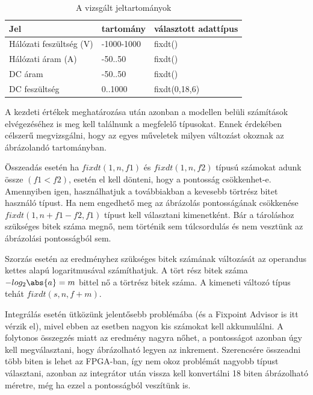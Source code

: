 \begin{table}[]
\centering
\begin{tabular}{|l|l|l|}
\hline
Jel  					&		 tartomány              & választott adattípus \\ \hline
Hálózati feszültség (V) & -1000-1000          	 		& fixdt()\\ \hline
Hálózati áram (A) 		& -50..50						& fixdt()\\ \hline
DC áram 				& -50..50        	   	   		& fixdt() \\ \hline
DC feszültség  			& 0..1000     			 		& fixdt(0,18,6)    \\ \hline
\end{tabular}
\caption{A vizsgált jeltartományok}
\label{tab:values}
\end{table} 


A kezdeti értékek meghatározása után azonban a modellen belüli számítások elvégezéséhez is meg kell találnunk a megfelelő típusokat. Ennek érdekében célszerű megvizsgálni, hogy az egyes műveletek milyen változást okoznak az ábrázolandó tartományban.

Összeadás esetén ha $fixdt(1,n,f1)$ és $fixdt(1,n,f2)$ típusú számokat adunk össze $(f1 < f2)$, esetén el kell dönteni, hogy a pontosság csökkenhet-e. Amennyiben igen, használhatjuk a továbbiakban a kevesebb törtrész bitet használó típust. Ha nem engedhető meg az ábrázolás pontosságának csökkenése $fixdt(1,n+f1-f2,f1)$ típust kell választani kimenetként. Bár a tároláshoz szükséges bitek száma megnő, nem történik sem túlcsordulás és nem vesztünk az ábrázolási pontosságból sem.

Szorzás esetén az eredményhez szükséges bitek számának változását az operandus kettes alapú logaritmusával számíthatjuk. A tört rész bitek száma $-log_2\abs{a} = m$ bittel nő a törtrész bitek száma. A kimeneti változó típus tehát $fixdt(s,n,f+m)$.

Integrálás esetén ütközünk jelentősebb problémába (és a Fixpoint Advisor is itt vérzik el), mivel ebben az esetben nagyon kis számokat kell akkumulálni. A folytonos összegzés miatt az eredmény nagyra nőhet, a pontosságot azonban úgy kell megválasztani, hogy ábrázolható legyen az inkrement. Szerencsére összeadni több biten is lehet az FPGA-ban, így nem okoz problémát nagyobb típust választani, azonban az integrátor után vissza kell konvertálni 18 biten ábrázolható méretre, még ha ezzel a pontosságból veszítünk is.

